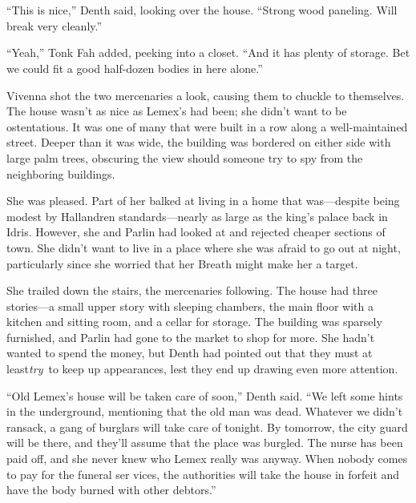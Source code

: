 \chapter{}

“This is nice,” Denth said, looking over the house. “Strong wood paneling. Will break very cleanly.”

“Yeah,” Tonk Fah added, peeking into a closet. “And it has plenty of storage. Bet we could fit a good half-dozen bodies in here alone.”

Vivenna shot the two mercenaries a look, causing them to chuckle to themselves. The house wasn’t as nice as Lemex’s had been; she didn’t want to be ostentatious. It was one of many that were built in a row along a well-maintained street. Deeper than it was wide, the building was bordered on either side with large palm trees, obscuring the view should someone try to spy from the neighboring buildings.

She was pleased. Part of her balked at living in a home that was—despite being modest by Hallandren standards—nearly as large as the king’s palace back in Idris. However, she and Parlin had looked at and rejected cheaper sections of town. She didn’t want to live in a place where she was afraid to go out at night, particularly since she worried that her Breath might make her a target.

She trailed down the stairs, the mercenaries following. The house had three stories—a small upper story with sleeping chambers, the main floor with a kitchen and sitting room, and a cellar for storage. The building was sparsely furnished, and Parlin had gone to the market to shop for more. She hadn’t wanted to spend the money, but Denth had pointed out that they must at least\textit{try}~to keep up appearances, lest they end up drawing even more attention.

“Old Lemex’s house will be taken care of soon,” Denth said. “We left some hints in the underground, mentioning that the old man was dead. Whatever we didn’t ransack, a gang of burglars will take care of tonight. By tomorrow, the city guard will be there, and they’ll assume that the place was burgled. The nurse has been paid off, and she never knew who Lemex really was anyway. When nobody comes to pay for the funeral ser vices, the authorities will take the house in forfeit and have the body burned with other debtors.”

